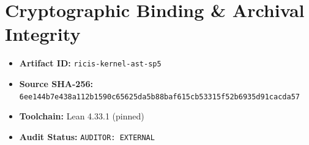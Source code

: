 \documentclass[11pt,a4paper]{article}
\begin{document}
\section{Cryptographic Binding & Archival Integrity}
\begin{itemize}
  \item \textbf{Artifact ID:} \texttt{ricis-kernel-ast-sp5}
  \item \textbf{Source SHA-256:} \texttt{6ee144b7e438a112b1590c65625da5b88baf615cb53315f52b6935d91cacda57}
  \item \textbf{Toolchain:} Lean 4.33.1 (pinned)
  \item \textbf{Audit Status:} \texttt{AUDITOR: EXTERNAL}
\end{itemize}
\end{document}
